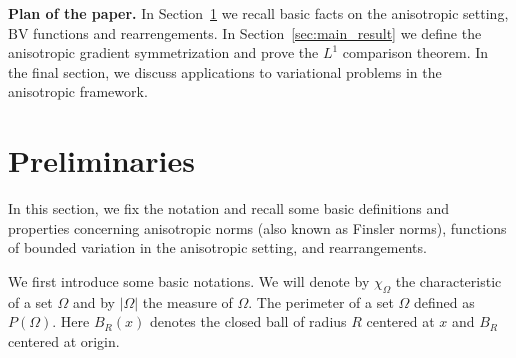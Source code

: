 \documentclass[oneside,a4paper,12pt,notitlepage]{article}
\theoremstyle{definition}
\newcommand{\BV}{\text{BV}}
\begin{document}
\medskip

\noindent\textbf{Plan of the paper.}
In Section~\ref{sec:preliminaries} we recall basic facts on the anisotropic setting, $\BV$ functions and rearrengements.
In Section~\ref{sec:main_result} we define the anisotropic gradient symmetrization and prove the $L^1$ comparison theorem.
In the final section, we discuss applications to variational problems in the anisotropic framework.





\section{Preliminaries}
\label{sec:preliminaries}

In this section, we fix the notation and recall some basic definitions and properties concerning anisotropic norms (also known as Finsler norms), functions of bounded variation in the anisotropic setting, and rearrangements.%

We first introduce some basic notations. 
We will denote by $\chi_{\Omega}$ the characteristic of a set $\Omega$ and by $|\Omega|$ the measure of $\Omega$. The perimeter of a set $\Omega$ defined as $P(\Omega)$. Here $B_R(x)$ denotes the closed ball of radius $R$ centered at $x$ and $B_R$ centered at origin.
\end{document}

